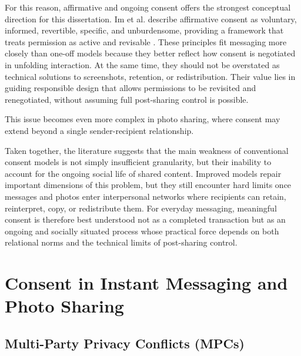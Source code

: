 For this reason, affirmative and ongoing consent offers the strongest conceptual direction for this dissertation. Im et al. describe affirmative consent as voluntary, informed, revertible, specific, and unburdensome, providing a framework that treats permission as active and revisable \cite{im_yes_2021}. These principles fit messaging more closely than one-off models because they better reflect how consent is negotiated in unfolding interaction. At the same time, they should not be overstated as technical solutions to screenshots, retention, or redistribution. Their value lies in guiding responsible design that allows permissions to be revisited and renegotiated, without assuming full post-sharing control is possible.  

This issue becomes even more complex in photo sharing, where consent may extend beyond a single sender-recipient relationship. 

Taken together, the literature suggests that the main weakness of conventional consent models is not simply insufficient granularity, but their inability to account for the ongoing social life of shared content. Improved models repair important dimensions of this problem, but they still encounter hard limits once messages and photos enter interpersonal networks where recipients can retain, reinterpret, copy, or redistribute them. For everyday messaging, meaningful consent is therefore best understood not as a completed transaction but as an ongoing and socially situated process whose practical force depends on both relational norms and the technical limits of post-sharing control.


\section{Consent in Instant Messaging and Photo Sharing}

\subsection{Multi-Party Privacy Conflicts (MPCs)}

